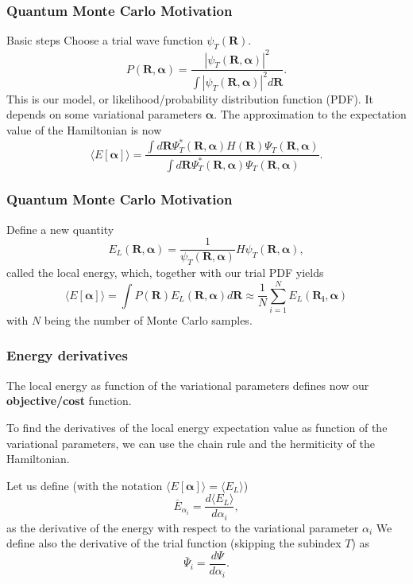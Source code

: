 \documentclass{beamer}
\begin{document}
\begin{frame}
\frametitle{Quantum Monte Carlo Motivation}

\begin{block}{Basic steps }
Choose a trial wave function
$\psi_T(\bm{R})$.
\[
   P(\bm{R},\bm{\alpha})= \frac{\left|\psi_T(\bm{R},\bm{\alpha})\right|^2}{\int \left|\psi_T(\bm{R},\bm{\alpha})\right|^2d\bm{R}}.
\]
This is our model, or likelihood/probability distribution function  (PDF). It depends on some variational parameters $\bm{\alpha}$.
The approximation to the expectation value of the Hamiltonian is now 
\[
   \langle E[\bm{\alpha}] \rangle = 
   \frac{\int d\bm{R}\Psi^{\ast}_T(\bm{R},\bm{\alpha})H(\bm{R})\Psi_T(\bm{R},\bm{\alpha})}
        {\int d\bm{R}\Psi^{\ast}_T(\bm{R},\bm{\alpha})\Psi_T(\bm{R},\bm{\alpha})}.
\]
\end{block}
\end{frame}

\begin{frame}
\frametitle{Quantum Monte Carlo Motivation}

\begin{block}{Define a new quantity }
\[
   E_L(\bm{R},\bm{\alpha})=\frac{1}{\psi_T(\bm{R},\bm{\alpha})}H\psi_T(\bm{R},\bm{\alpha}),
\]
called the local energy, which, together with our trial PDF yields
\[
  \langle E[\bm{\alpha}] \rangle=\int P(\bm{R})E_L(\bm{R},\bm{\alpha}) d\bm{R}\approx \frac{1}{N}\sum_{i=1}^NE_L(\bm{R_i},\bm{\alpha})
\]
with $N$ being the number of Monte Carlo samples.
\end{block}
\end{frame}

\begin{frame}
\frametitle{Energy derivatives}

\begin{block}{}
The local energy as function of the variational parameters defines now our \textbf{objective/cost} function.

To find the derivatives of the local energy expectation value as function of the variational parameters, we can use the chain rule and the hermiticity of the Hamiltonian.  

Let us define (with the notation $\langle E[\bm{\alpha}]\rangle =\langle  E_L\rangle$)
\[
\bar{E}_{\alpha_i}=\frac{d\langle  E_L\rangle}{d\alpha_i},
\]
as the derivative of the energy with respect to the variational parameter $\alpha_i$
We define also the derivative of the trial function (skipping the subindex $T$) as 
\[
\bar{\Psi}_{i}=\frac{d\Psi}{d\alpha_i}.
\]
\end{block}
\end{frame}
\end{document}
